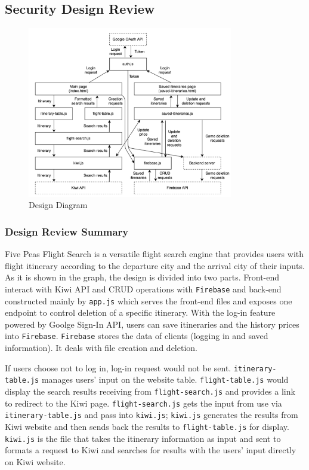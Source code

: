 \documentclass[12pt, a4paper]{article}
\newcommand{\code}[1]{\texttt{#1}}
\begin{document}
\subsection{Security Design Review}
\begin{figure}[ht]
\centering
\includegraphics[width=0.8\textwidth]{design_structure.png}
\caption{Design Diagram}
\label{fig:design_diagram}
\end{figure}
\subsubsection{Design Review Summary}
Five Peas Flight Search is a versatile flight search engine that provides users with flight itinerary according to the departure city and the arrival city of their inputs. As it is shown in the graph, the design is divided into two parts. Front-end interact with Kiwi API and CRUD operations with \code{Firebase} and back-end constructed mainly by \code{app.js} which serves the front-end files and exposes one endpoint to control deletion of a specific itinerary. With the log-in feature powered by Goolge Sign-In API, users can save itineraries and the history prices into \code{Firebase}. \code{Firebase} stores the data of clients (logging in and saved information). It deals with file creation and deletion. 

If users choose not to log in,  log-in request would not be sent. \code{itinerary-table.js} manages users' input on the website table. \code{flight-table.js} would display the search results receiving from \code{flight-search.js} and provides a link to redirect to the Kiwi page. \code{flight-search.js} gets the input from use via \code{itinerary-table.js} and pass into \code{kiwi.js}; \code{kiwi.js} generates the results from Kiwi website and then sends back the results to \code{flight-table.js} for display. \code{kiwi.js} is the file that takes the itinerary information as input and sent to formats a request to Kiwi and searches for results with the users' input directly on Kiwi website.
\end{document}
